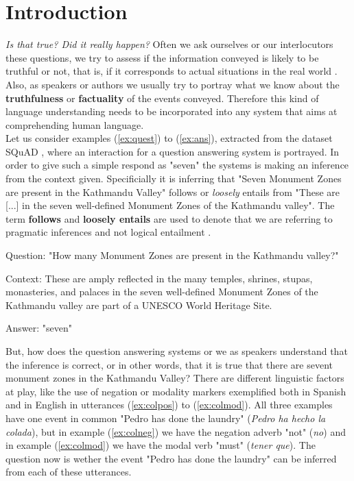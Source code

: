 \label{chap:intr}
\section{Introduction}
\textit{Is that true? Did it really happen?} Often we ask ourselves or our interlocutors these questions, we try to assess if the information conveyed is likely to be truthful or not, that is, if it corresponds to actual situations in the real world \citep{sauri2009factbank}. Also, as speakers or authors we usually try to portray what we know about the \textbf{truthfulness} or \textbf{factuality} of the events conveyed. Therefore this kind of language understanding needs to be incorporated into any system that aims at comprehending human language.\\

Let us consider examples (\ref{ex:quest}) to (\ref{ex:ans}), extracted from the dataset SQuAD \citep{rajpurkar2016squad}, where an interaction for a question answering system is portrayed. In order to give such a simple respond as "seven" the systems is making an inference from the context given. Specificially it is inferring that "Seven Monument Zones are present in the Kathmandu Valley" follows or \textit{loosely} entails from "These are [...] in the seven well-defined Monument Zones of the Kathmandu valley". The term \textbf{follows} and \textbf{loosely entails} are used to denote that we are referring to pragmatic inferences and not logical entailment \citep{manning2006local}.\\ 

\begin{exe}
        \ex\label{ex:quest}
        \begin{xlist}
                \item Question: "How many Monument Zones are present in the Kathmandu valley?" \label{ex:quest}
                \item Context: These are amply reflected in the many temples, shrines, stupas, monasteries, and palaces in the seven well-defined Monument Zones of the Kathmandu valley are part of a UNESCO World Heritage Site.\label{ex:cont}
                \item Answer: "seven"\label{ex:ans}
        \end{xlist}
\end{exe}

But, how does the question answering systems or we as speakers understand that the inference is correct, or in other words, that it is true that there are sevent monument zones in the Kathmandu Valley? There are different linguistic factors at play, like the use of negation or modality markers exemplified both in Spanish and in English in utterances (\ref{ex:colpos}) to (\ref{ex:colmod}). All three examples have one event in common "Pedro has done the laundry" (\textit{Pedro ha hecho la colada}), but in example (\ref{ex:colneg}) we have the negation adverb "not" (\textit{no}) and in example (\ref{ex:colmod}) we have the modal verb "must" (\textit{tener que}). The question now is wether the event "Pedro has done the laundry" can be inferred from each of these utterances.\\

